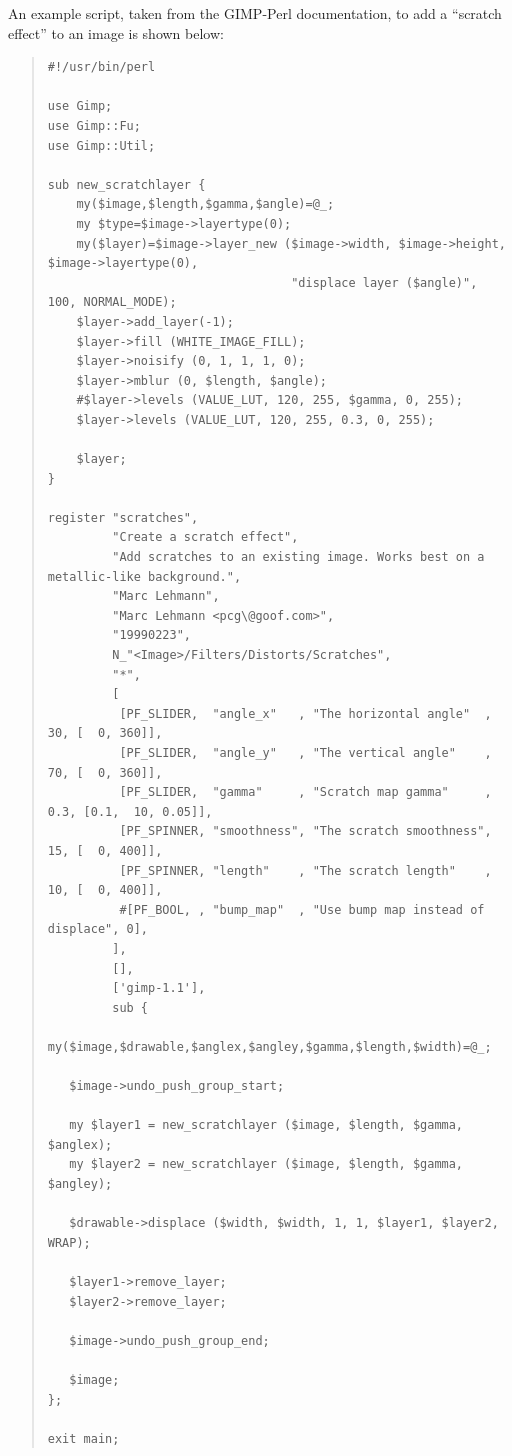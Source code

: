 \documentclass[twoside,11pt]{article}
\begin{document}
An example script, taken from the GIMP-Perl documentation, to add a
``scratch effect'' to an image is shown below:

\small
\begin{quote}
\begin{verbatim}
#!/usr/bin/perl

use Gimp;
use Gimp::Fu;
use Gimp::Util;

sub new_scratchlayer {
    my($image,$length,$gamma,$angle)=@_;
    my $type=$image->layertype(0);
    my($layer)=$image->layer_new ($image->width, $image->height, $image->layertype(0),
                                  "displace layer ($angle)", 100, NORMAL_MODE);
    $layer->add_layer(-1);
    $layer->fill (WHITE_IMAGE_FILL);
    $layer->noisify (0, 1, 1, 1, 0);
    $layer->mblur (0, $length, $angle);
    #$layer->levels (VALUE_LUT, 120, 255, $gamma, 0, 255);
    $layer->levels (VALUE_LUT, 120, 255, 0.3, 0, 255);

    $layer;
}

register "scratches",
         "Create a scratch effect",
         "Add scratches to an existing image. Works best on a metallic-like background.",
         "Marc Lehmann",
         "Marc Lehmann <pcg\@goof.com>",
         "19990223",
         N_"<Image>/Filters/Distorts/Scratches",
         "*",
         [
          [PF_SLIDER,  "angle_x"   , "The horizontal angle"  ,  30, [  0, 360]],
          [PF_SLIDER,  "angle_y"   , "The vertical angle"    ,  70, [  0, 360]],
          [PF_SLIDER,  "gamma"     , "Scratch map gamma"     , 0.3, [0.1,  10, 0.05]],
          [PF_SPINNER, "smoothness", "The scratch smoothness",  15, [  0, 400]],
          [PF_SPINNER, "length"    , "The scratch length"    ,  10, [  0, 400]],
          #[PF_BOOL, , "bump_map"  , "Use bump map instead of displace", 0],
         ],
         [],
         ['gimp-1.1'],
         sub {
   my($image,$drawable,$anglex,$angley,$gamma,$length,$width)=@_;

   $image->undo_push_group_start;

   my $layer1 = new_scratchlayer ($image, $length, $gamma, $anglex);
   my $layer2 = new_scratchlayer ($image, $length, $gamma, $angley);

   $drawable->displace ($width, $width, 1, 1, $layer1, $layer2, WRAP);

   $layer1->remove_layer;
   $layer2->remove_layer;

   $image->undo_push_group_end;

   $image;
};

exit main;
\end{verbatim}
\end{quote}
\normalsize
\end{document}
